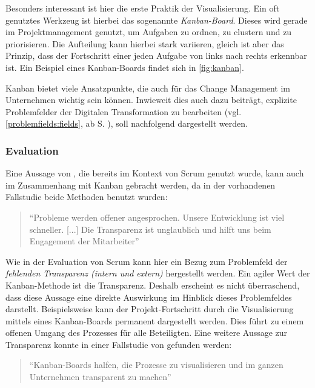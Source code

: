 Besonders interessant ist hier die erste Praktik der Visualisierung. Ein oft genutztes Werkzeug ist hierbei das sogenannte \textit{Kanban-Board}. Dieses wird gerade im Projektmanagement genutzt, um Aufgaben zu ordnen, zu clustern und zu priorisieren. Die Aufteilung kann hierbei stark variieren, gleich ist aber das Prinzip, dass der Fortschritt einer jeden Aufgabe von links nach rechts erkennbar ist. \cite[S. 21]{anderson_essenz_2018} Ein Beispiel eines Kanban-Boards findet sich in \ref{fig:kanban}.

Kanban bietet viele Ansatzpunkte, die auch für das Change Management im Unternehmen wichtig sein können. Inwieweit dies auch dazu beiträgt, explizite Problemfelder der Digitalen Transformation zu bearbeiten (vgl. \ref{problemfields:fields}, ab S. \pageref{problemfields:fields}), soll nachfolgend dargestellt werden.

\subsubsection{Evaluation}

Eine Aussage von , die bereits im Kontext von Scrum genutzt wurde, kann auch im Zusammenhang mit Kanban gebracht werden, da in der vorhandenen Fallstudie beide Methoden benutzt wurden:

\begin{quote}
	``Probleme werden offener angesprochen. Unsere Entwicklung ist viel schneller. [...] Die Transparenz ist unglaublich und hilft uns beim Engagement der Mitarbeiter'' \cite[S. 5]{fuchs_adapting_2019}
\end{quote}

Wie in der Evaluation von Scrum kann hier ein Bezug zum Problemfeld der \textit{fehlenden Transparenz (intern und extern)} hergestellt werden. Ein agiler Wert der Kanban-Methode ist die Transparenz. Deshalb erscheint es nicht überraschend, dass diese Aussage eine direkte Auswirkung im Hinblick dieses Problemfeldes darstellt. Beispielsweise kann der Projekt-Fortschritt durch die Visualisierung mittels eines Kanban-Boards permanent dargestellt werden. Dies führt zu einem offenen Umgang des Prozesses für alle Beteiligten. Eine weitere Aussage zur Transparenz konnte in einer Fallstudie von  gefunden werden:

\begin{quote}
	``Kanban-Boards halfen, die Prozesse zu visualisieren und im ganzen Unternehmen transparent zu machen'' \cite[S. 213]{hofert_agile_2018}
\end{quote}

